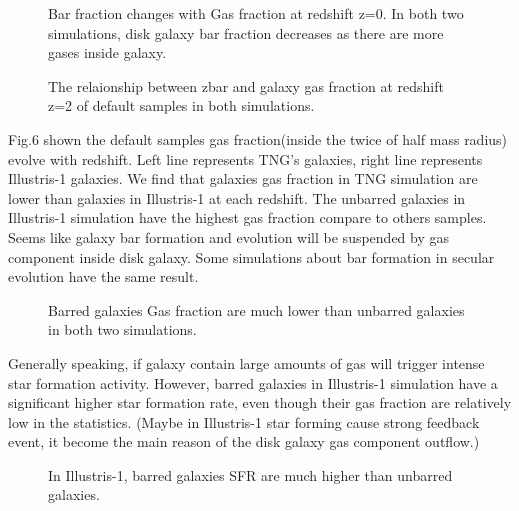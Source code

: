 \label{subsec:tables}
\begin{figure}[htbp]
\begin{center}
\caption{Bar fraction changes with Gas fraction at redshift z=0. In both two simulations, disk galaxy bar fraction decreases as there are more gases inside galaxy.}
\end{center}
\end{figure}

\label{subsec:tables}
\begin{figure}[htbp]
\begin{center}
\caption{The relaionship between zbar and galaxy gas fraction at redshift z=2 of default samples in both simulations.}
\end{center}
\end{figure}

Fig.6 shown the default samples gas fraction(inside the twice of half mass radius) evolve with redshift.
Left line represents TNG's galaxies, right line represents Illustris-1 galaxies.
We find that galaxies gas fraction in TNG simulation are lower than galaxies in Illustris-1 at each redshift. 
The unbarred galaxies in Illustris-1 simulation have the highest gas fraction compare to others samples. 
Seems like galaxy bar formation and evolution will be suspended by gas component inside disk galaxy.
Some simulations \citep{E. Athanassoula et. al. 2012} about bar formation in secular evolution have the same result.
\label{subsec:tables}
\begin{figure*}[h!]
\begin{center}
\caption{Barred galaxies Gas fraction are much lower than unbarred galaxies in both two simulations.}
\end{center}
\end{figure*}

Generally speaking, if galaxy contain large amounts of gas will trigger intense star formation activity.
However, barred galaxies in Illustris-1 simulation have a significant higher star formation rate,
even though their gas fraction are relatively low in the statistics.
(Maybe in Illustris-1 star forming cause strong feedback event,  it become the main reason of the disk galaxy gas component outflow.)
\label{subsec:tables}
\begin{figure*}[h!]
\centering
\begin{center}
\caption{In Illustris-1, barred galaxies SFR are much higher than unbarred galaxies.}
\end{center}
\end{figure*}

